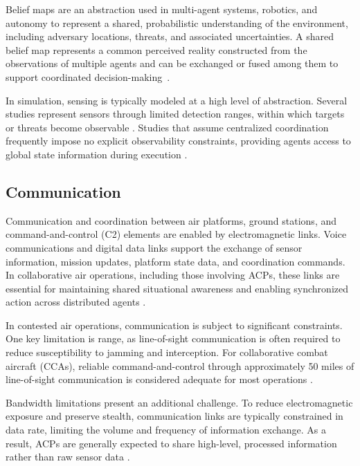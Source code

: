 Belief maps are an abstraction used in multi-agent systems, robotics, and autonomy to represent a shared, probabilistic understanding of the environment, including adversary locations, threats, and associated uncertainties. A shared belief map represents a common perceived reality constructed from the observations of multiple agents and can be exchanged or fused among them to support coordinated decision-making~\cite{Huang2024BeliefMap, Wang2025CooperativeUAV}.

In simulation, sensing is typically modeled at a high level of abstraction. Several studies represent sensors through limited detection ranges, within which targets or threats become observable \cite{Wang2025CooperativeUAV,Jiang2025DDPGSwarmTaskPlanning}. Studies that assume centralized coordination frequently impose no explicit observability constraints, providing agents access to global state information during execution \cite{yue2022uav_sead_hmarl, yuksek2021cooperative}. 


\subsection{Communication} 
Communication and coordination between air platforms, ground stations, and command-and-control (C2) elements are enabled by electromagnetic links. Voice communications and digital data links support the exchange of sensor information, mission updates, platform state data, and coordination commands. In collaborative air operations, including those involving ACPs, these links are essential for maintaining shared situational awareness and enabling synchronized action across distributed agents \cite{gunzinger2024cca}.

In contested air operations, communication is subject to significant constraints. One key limitation is range, as line-of-sight communication is often required to reduce susceptibility to jamming and interception. For collaborative combat aircraft (CCAs), reliable command-and-control through approximately 50 miles of line-of-sight communication is considered adequate for most operations \cite{gunzinger2024cca}. 

Bandwidth limitations present an additional challenge. To reduce electromagnetic exposure and preserve stealth, communication links are typically constrained in data rate, limiting the volume and frequency of information exchange. As a result, ACPs are generally expected to share high-level, processed information rather than raw sensor data \cite{gunzinger2024cca, xu2025mdrl_uav_combat}.

